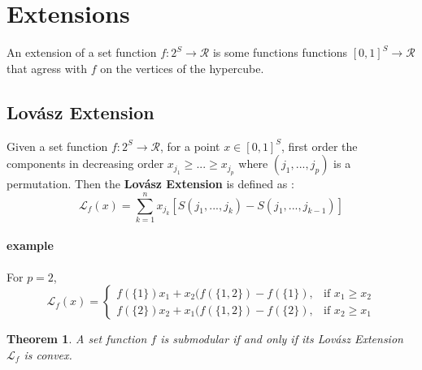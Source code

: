 \documentclass[options]{article}
\newtheorem{theorem}{Theorem}
\theoremstyle{definition}
\begin{document}
\section{Extensions}
An extension of a set function $f: 2^S \rightarrow \mathcal{R}$ is some functions functions $[0,1]^S \rightarrow \mathcal{R}$ that agress with $f$ on the vertices of the hypercube.
\subsection{Lov{\'a}sz Extension}
Given a set function $f: 2^S \rightarrow \mathcal{R}$, for a point $ x \in [0,1]^S$, first order the components in decreasing order $x_{j_1} \geq ...\geq x_{j_p}$ where $(j_1,...,j_p)$ is a permutation. Then the \textbf{Lov{\'a}sz Extension} is defined as :
\[
\mathcal{L}_f (x) = \sum_{k=1}^n x_{j_k} [S({j_1,...,j_k}) - S({j_1,...,j_{k-1}})]
\]
\paragraph{example} 
For $p=2$,
\[
\mathcal{L}_f (x)=\begin{cases}
   f(\{1\})x_1+ x_2(f(\{1,2\})- f(\{1\}),& \text{if } x_1 \geq x_2\\
     f(\{2\})x_2+ x_1(f(\{1,2\})- f(\{2\}),& \text{if } x_2 \geq x_1
\end{cases}
\] 
\begin{theorem}
A set function $f$ is submodular if and only if its Lov{\'a}sz Extension $\mathcal{L}_f$ is convex.
\end{theorem}
\end{document}
